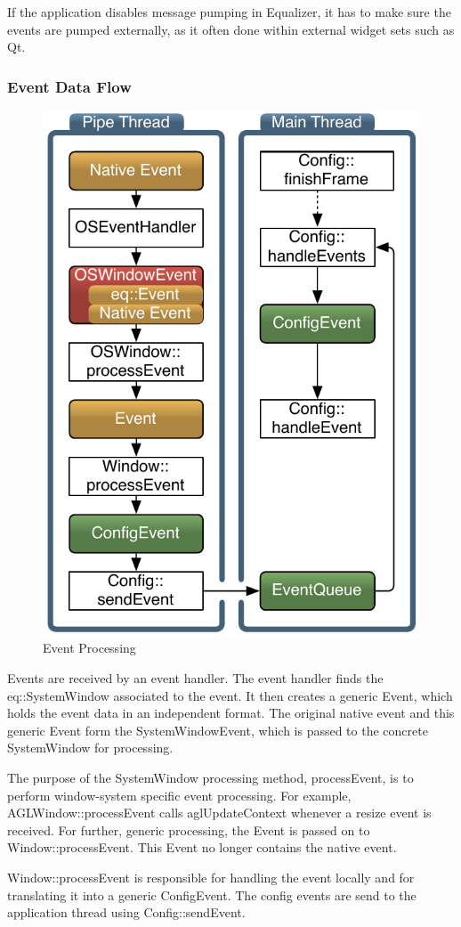 \documentclass[10pt,a4]{scrartcl}
\begin{document}
If the application disables message pumping in Equalizer, it has to make
sure the events are pumped externally, as it often done within external
widget sets such as Qt.

\subsubsection{Event Data Flow}

\begin{figure}
  \vspace{-2ex}\includegraphics[width=.382\textwidth]{images/eventFilter.pdf}
  {\caption{\label{fEventProcessing}Event Processing}}\vspace{-4ex}
\end{figure}
Events are received by an event handler. The event handler finds the
\textsf{eq::Sys\-tem\-Win\-dow} associated to the event. It then creates a
generic \textsf{Event}, which holds the event data in an independent format. The
original native event and this generic \textsf{Event} form the
\textsf{SystemWindowEvent}, which is passed to the concrete
\textsf{SystemWindow} for processing.

The purpose of the \textsf{SystemWindow} processing method,
\textsf{processEvent}, is to perform window-system specific event
processing. For example, \textsf{AGLWindow::processEvent} calls
\textsf{aglUpdateContext} whenever a resize event is received. For
further, generic processing, the \textsf{Event} is passed on to
\textsf{Window::processEvent}. This \textsf{Event} no longer contains
the native event.

\textsf{Window::processEvent} is responsible for handling
the event locally and for translating it into a generic
\textsf{ConfigEvent}. The config events are send to the application
thread using \textsf{Config::sendEvent}. 
\end{document}

